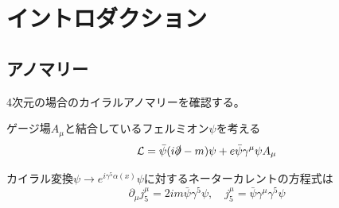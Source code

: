 \documentclass[
  unicode,a4paper,9pt,
  xcolor = {dvipsnames,svgnames},
  hyperref ={colorlinks=true,citecolor=Navy,linkcolor=NavyBlue,urlcolor=purple},
  ja=standard,lualatex
]{beamer}
\begin{document}
\section{イントロダクション}

\begin{frame}[plain]
  \huge \secname
\end{frame}

\subsection{アノマリー}

\begin{frame}{\subsecname}

  4次元の場合のカイラルアノマリーを確認する。

  \pause
  \vspace*{10pt}

  ゲージ場$A_{\mu}$と結合しているフェルミオン$\psi$を考える
  \begin{equation}
    \mathcal{L}
    =
    \bar{\psi}(i\slashed{\partial}-m)\psi
    +
    e\bar{\psi}\gamma^{\mu}\psi A_{\mu}
    \nonumber
  \end{equation}

  \vspace*{10pt}

  カイラル変換$\psi\rightarrow e^{i\gamma^{5}\alpha(x)}\psi$に対するネーターカレントの方程式は
  \begin{equation}
    \partial_{\mu}j^{\mu}_{5}
    =
    2im\bar{\psi}\gamma^{5}\psi
    ,\quad
    j^{\mu}_{5}
    =
    \bar{\psi}\gamma^{\mu}\gamma^{5}\psi
    \nonumber
  \end{equation}

\end{frame}
\end{document}

